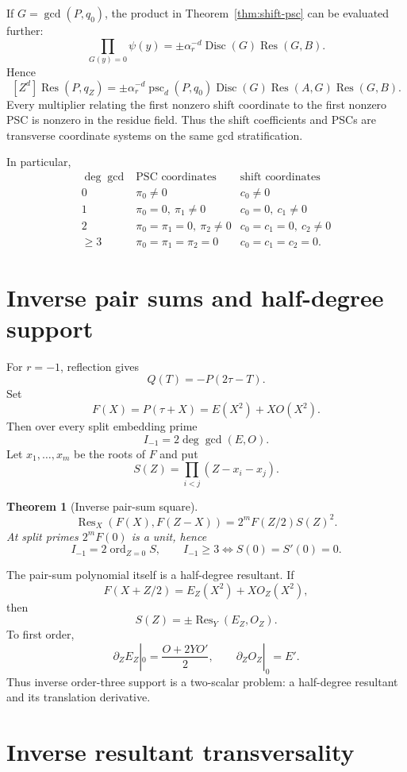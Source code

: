 \documentclass[11pt]{article}
\newtheorem{theorem}{Theorem}[section]
\newcommand{\Res}{\operatorname{Res}}
\newcommand{\Disc}{\operatorname{Disc}}
\newcommand{\ord}{\operatorname{ord}}
\begin{document}
If $G=\gcd(P,q_0)$, the product in
Theorem~\ref{thm:shift-psc} can be evaluated further:
\[
\prod_{G(y)=0}\psi(y)
 =\pm\alpha_r^{-d}\Disc(G)\Res(G,B).
\]
Hence
\begin{equation}\label{eq:explicit-local}
[Z^d]\Res(P,q_Z)
 =\pm\alpha_r^{-d}
 \operatorname{psc}_d(P,q_0)
 \Disc(G)\Res(A,G)\Res(G,B).
\end{equation}
Every multiplier relating the first nonzero shift coordinate to the first
nonzero PSC is nonzero in the residue field.  Thus the shift coefficients and
PSCs are transverse coordinate systems on the same gcd stratification.

In particular,
\[
\begin{array}{c|c|c}
\deg\gcd&\text{PSC coordinates}&\text{shift coordinates}\\\hline
0&\pi_0\ne0&c_0\ne0\\
1&\pi_0=0,\ \pi_1\ne0&c_0=0,\ c_1\ne0\\
2&\pi_0=\pi_1=0,\ \pi_2\ne0&c_0=c_1=0,\ c_2\ne0\\
\ge3&\pi_0=\pi_1=\pi_2=0&c_0=c_1=c_2=0.
\end{array}
\]

\section{Inverse pair sums and half-degree support}

For $r=-1$, reflection gives
\[
Q(T)=-P(2\tau-T).
\]
Set
\[
F(X)=P(\tau+X)=E(X^2)+XO(X^2).
\]
Then over every split embedding prime
\[
I_{-1}=2\deg\gcd(E,O).
\]
Let $x_1,\ldots,x_m$ be the roots of $F$ and put
\[
S(Z)=\prod_{i<j}(Z-x_i-x_j).
\]

\begin{theorem}[Inverse pair-sum square]\label{thm:pairsum}
\[
\Res_X(F(X),F(Z-X))=2^mF(Z/2)S(Z)^2.
\]
At split primes $2^mF(0)$ is a unit, hence
\[
I_{-1}=2\ord_{Z=0}S,
\qquad
I_{-1}\ge3\iff S(0)=S'(0)=0.
\]
\end{theorem}

The pair-sum polynomial itself is a half-degree resultant.  If
\[
F(X+Z/2)=E_Z(X^2)+XO_Z(X^2),
\]
then
\begin{equation}\label{eq:translated}
S(Z)=\pm\Res_Y(E_Z,O_Z).
\end{equation}
To first order,
\[
\partial_ZE_Z|_0=\frac{O+2YO'}2,
\qquad
\partial_ZO_Z|_0=E'.
\]
Thus inverse order-three support is a two-scalar problem: a half-degree
resultant and its translation derivative.

\section{Inverse resultant transversality}
\end{document}
